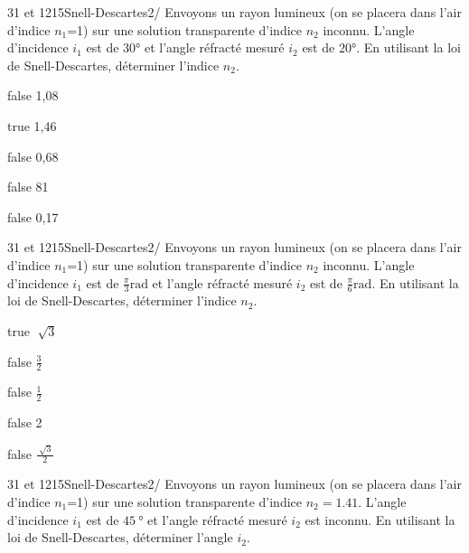 \documentclass[11pt]{article}
\begin{document}
        	\begin{question}{31 et 1215}{Snell-Descartes}{2}{/}
				Envoyons un rayon lumineux (on se placera dans l'air d'indice $n_1$=1) sur une solution transparente d'indice $n_2$ inconnu. L'angle d'incidence $i_1$ est de $30\si\degree$ et l'angle réfracté mesuré $i_2$ est de $20\si\degree$. En utilisant la loi de Snell-Descartes, déterminer l'indice $n_2$.

            \end{question}

            \begin{reponses}
            	\item[false] 1,08
            	\item[true]  1,46
                \item[false] 0,68
                \item[false] 81
                \item[false] 0,17
            \end{reponses}
            
            \begin{question}{31 et 1215}{Snell-Descartes}{2}{/}
				Envoyons un rayon lumineux (on se placera dans l'air d'indice $n_1$=1) sur une solution transparente d'indice $n_2$ inconnu. L'angle d'incidence $i_1$ est de $\frac{\pi}{3} \si\radian$ et l'angle réfracté mesuré $i_2$ est de $\frac{\pi}{6} \si\radian$. En utilisant la loi de Snell-Descartes, déterminer l'indice $n_2$.

            \end{question}

            \begin{reponses}
            	\item[true] $\sqrt[]{3}$ 
            	\item[false] $\frac{3}{2}$
                \item[false] $\frac{1}{2}$
                \item[false] 2
                 \item[false] $\frac{\sqrt[]{3}}{2}$
            \end{reponses}
            
            \begin{question}{31 et 1215}{Snell-Descartes}{2}{/}
				Envoyons un rayon lumineux (on se placera dans l'air d'indice $n_1$=1) sur une solution transparente d'indice $n_2=1.41$. L'angle d'incidence $i_1$ est de $\SI{45}{\degree}$ et l'angle réfracté mesuré $i_2$ est inconnu. En utilisant la loi de Snell-Descartes, déterminer l'angle $i_2$.

            \end{question}
\end{document}
